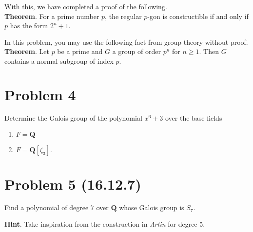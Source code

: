 \documentclass{amsart}
\begin{document}
With this, we have completed a proof of the following.\\
\textbf{Theorem}. For a prime number \(p\), the regular \(p\)-gon is constructible if and only if \(p\) has the form \(2^n+1\).

In this problem, you may use the following fact from group theory without proof. \\
\textbf{Theorem}. Let \(p\) be a prime and \(G\) a group of order \(p^{n}\) for \(n \geq 1\).  Then \(G\) contains a normal subgroup of index \(p\).
\section{Problem 4}
\label{sec:org8fd1dfc}

Determine the Galois group of the polynomial \(x^6+3\) over the base fields
\begin{enumerate}
\item \(F = \mathbf{Q}\)
\item \(F = \mathbf{Q}[\zeta_3]\).
\end{enumerate}
\section{Problem 5 (16.12.7)}
\label{sec:orgdfba458}

Find a polynomial of degree \(7\) over \(\mathbf{Q}\) whose Galois group is \(S_7\).

\textbf{Hint}. Take inspiration from the construction in \emph{Artin} for degree 5.
\end{document}
